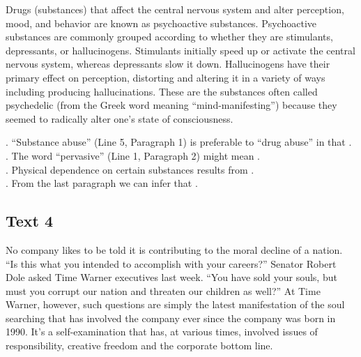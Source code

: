 Drugs (substances) that affect the central nervous system and alter perception, mood, and behavior are known as psychoactive substances. Psychoactive substances are commonly grouped according to whether they are stimulants, depressants, or hallucinogens. Stimulants initially speed up or activate the central nervous system, whereas depressants slow it down. Hallucinogens have their primary effect on perception, distorting and altering it in a variety of ways including producing hallucinations. These are the substances often called psychedelic (from the Greek word meaning “mind-manifesting”) because they seemed to radically alter one’s state of consciousness.
\begin{questions}  .	“Substance abuse” (Line 5, Paragraph 1) is preferable to “drug abuse” in that \ltk{}.\\
.	The word “pervasive” (Line 1, Paragraph 2) might mean \ltk{}.\\
.	Physical dependence on certain substances results from \ltk{}.\\
.	From the last paragraph we can infer that \ltk{}.\\
\end{questions}

\subsection{Text 4}
No company likes to be told it is contributing to the moral decline of a nation. “Is this what you intended to accomplish with your careers?” Senator Robert Dole asked Time Warner executives last week. “You have sold your souls, but must you corrupt our nation and threaten our children as well?” At Time Warner, however, such questions are simply the latest manifestation of the soul searching that has involved the company ever since the company was born in 1990. It’s a self-examination that has, at various times, involved issues of responsibility, creative freedom and the corporate bottom line.

